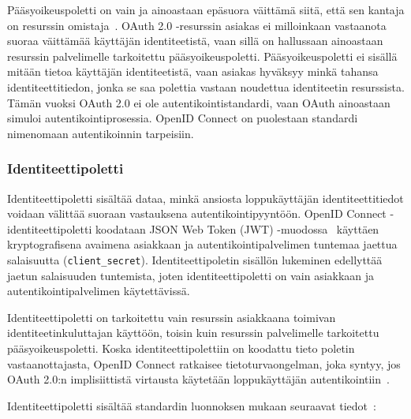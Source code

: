 \documentclass[finnish,gradu]{tktltiki}
\begin{document}
  Pääsyoikeuspoletti on vain ja ainoastaan epäsuora väittämä siitä, että sen kantaja on resurssin omistaja~\cite{bradley_oauth_authentication_problem_2012}. OAuth 2.0 -resurssin asiakas ei milloinkaan vastaanota suoraa väittämää käyttäjän identiteetistä, vaan sillä on hallussaan ainoastaan resurssin palvelimelle tarkoitettu pääsyoikeuspoletti. Pääsyoikeuspoletti ei sisällä mitään tietoa käyttäjän identiteetistä, vaan asiakas hyväksyy minkä tahansa identiteettitiedon, jonka se saa polettia vastaan noudettua identiteetin resurssista. Tämän vuoksi OAuth 2.0 ei ole autentikointistandardi, vaan OAuth ainoastaan simuloi autentikointiprosessia. OpenID Connect on puolestaan standardi nimenomaan autentikoinnin tarpeisiin.


  \subsubsection{Identiteettipoletti} %
  \label{ssub:identiteettipoletti}

  Identiteettipoletti sisältää dataa, minkä ansiosta loppukäyttäjän identiteettitiedot voidaan välittää suoraan vastauksena autentikointipyyntöön. OpenID Connect -identiteettipoletti koodataan JSON Web Token (JWT) -muodossa~\cite{json_web_token_2011} käyttäen kryptografisena avaimena asiakkaan ja autentikointipalvelimen tuntemaa jaettua salaisuutta (\verb!client_secret!). Identiteettipoletin sisällön lukeminen edellyttää jaetun salaisuuden tuntemista, joten identiteettipoletti on vain asiakkaan ja autentikointipalvelimen käytettävissä.

  Identiteettipoletti on tarkoitettu vain resurssin asiakkaana toimivan identiteetinkuluttajan käyttöön, toisin kuin resurssin palvelimelle tarkoitettu pääsyoikeuspoletti. Koska identiteettipolettiin on koodattu tieto poletin vastaanottajasta, OpenID Connect ratkaisee tietoturvaongelman, joka syntyy, jos OAuth 2.0:n implisiittistä virtausta käytetään loppukäyttäjän autentikointiin~\cite{bradley_oauth_authentication_problem_2012}.

  Identiteettipoletti sisältää standardin luonnoksen mukaan seuraavat tiedot~\cite{sakimura_openid_c_nutshell_2012}:
\end{document}
